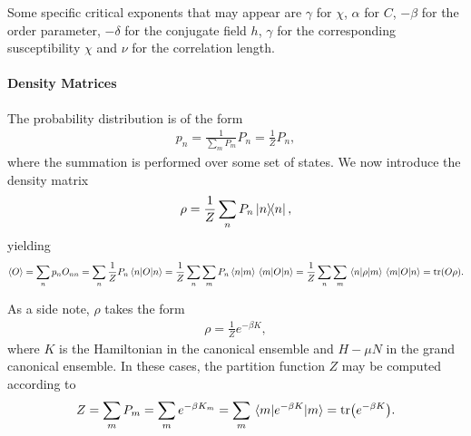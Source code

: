 Some specific critical exponents that may appear are $\gamma$ for $\chi$, $\alpha$ for $C$, $-\beta$ for the order parameter, $-\delta$ for the conjugate field $h$, $\gamma$ for the corresponding susceptibility $\chi$ and $\nu$ for the correlation length.

\paragraph{Density Matrices}
The probability distribution is of the form
\begin{align*}
	p_{n} = \frac{1}{\sum\limits_{m}P_{m}}P_{n} = \frac{1}{Z}P_{n},
\end{align*}
where the summation is performed over some set of states. We now introduce the density matrix
\begin{align*}
	\rho = \frac{1}{Z}\sum\limits_{n}P_{n}\op{n}{n},
\end{align*}
yielding
\begin{align*}
	\expval{O} = \sum\limits_{n}p_{n}O_{nn} = \sum\limits_{n}\frac{1}{Z}P_{n}\expval{O}{n} = \frac{1}{Z}\sum\limits_{n}\sum\limits_{m}P_{n}\braket{n}{m}\mel{m}{O}{n} = \frac{1}{Z}\sum\limits_{n}\sum\limits_{m}\mel{n}{\rho}{m}\mel{m}{O}{n} = \tr(O\rho).
\end{align*}

As a side note, $\rho$ takes the form
\begin{align*}
	\rho = \frac{1}{Z}e^{-\beta K},
\end{align*}
where $K$ is the Hamiltonian in the canonical ensemble and $H - \mu N$ in the grand canonical ensemble. In these cases, the partition function $Z$ may be computed according to
\begin{align*}
	Z = \sum\limits_{m}P_{m} = \sum\limits_{m}e^{-\beta K_{m}} = \sum\limits_{m}\mel{m}{e^{-\beta K}}{m} = \tr(e^{-\beta K}).
\end{align*}

